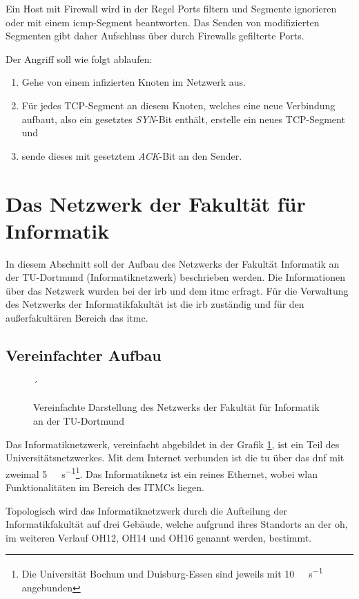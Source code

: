 Ein Host mit Firewall wird in der Regel Ports filtern und Segmente ignorieren oder mit einem \gls{icmp}-Segment beantworten. Das Senden von modifizierten Segmenten gibt daher Aufschluss über durch Firewalls gefilterte Ports.

Der Angriff soll wie folgt ablaufen:
\begin{enumerate}
	\item Gehe von einem infizierten Knoten im Netzwerk aus.
	\item Für jedes TCP-Segment an diesem Knoten, welches eine neue Verbindung aufbaut, also ein gesetztes \emph{SYN}-Bit enthält, erstelle ein neues TCP-Segment und
	\item sende dieses mit gesetztem \emph{ACK}-Bit an den Sender.
\end{enumerate}

\section{Das Netzwerk der Fakultät für Informatik}\label{sec:aufbau}
In diesem Abschnitt soll der Aufbau des Netzwerks der Fakultät Informatik an der TU-Dortmund (Informatiknetzwerk) beschrieben werden. Die Informationen über das Netzwerk wurden bei der \gls{irb} und dem \gls{itmc} erfragt. Für die Verwaltung des Netzwerks der Informatikfakultät ist die \gls{irb} zuständig und für den außerfakultären Bereich das \gls{itmc}.

\subsection{Vereinfachter Aufbau}
\begin{figure}[ht]
	\centering
	
	\caption[Vereinfachtes Informatiknetzwerk]{Vereinfachte Darstellung des Netzwerks der Fakultät für Informatik an der TU-Dortmund}
	\label{fig:tucsnetwork}´
\end{figure}

Das Informatiknetzwerk, vereinfacht abgebildet in der Grafik \ref{fig:tucsnetwork}, ist ein Teil des Universitätsnetzwerkes. Mit dem Internet verbunden ist die \gls{tu} über das \gls{dnf} mit zweimal  \SI{5}{\giga\bit\per\second}\footnote{Die Universität Bochum und Duisburg-Essen sind jeweils mit \SI{10}{\giga\bit\per\second} angebunden}. Das Informatiknetz ist ein reines Ethernet, wobei \gls{wlan} Funktionalitäten im Bereich des ITMCs liegen. 

Topologisch wird das Informatiknetzwerk durch die Aufteilung der Informatikfakultät auf drei Gebäude, welche aufgrund ihres Standorts an der \gls{oh}, im weiteren Verlauf OH12, OH14 und OH16 genannt werden, bestimmt.

